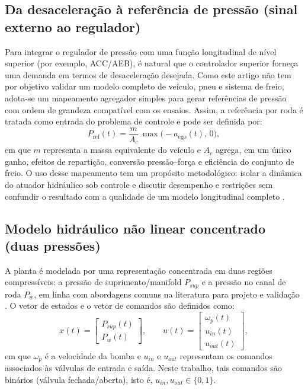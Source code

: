 \documentclass[a4paper]{ifacconf}
\begin{document}
\subsection{Da desaceleração à referência de pressão (sinal externo ao regulador)}
Para integrar o regulador de pressão com uma função longitudinal de nível superior (por exemplo, ACC/AEB), é natural que o controlador superior forneça uma demanda em termos de desaceleração desejada. Como este artigo não tem por objetivo validar um modelo completo de veículo, pneu e sistema de freio, adota-se um mapeamento agregador simples para gerar referências de pressão com ordem de grandeza compatível com os ensaios. Assim, a referência por roda é tratada como entrada do problema de controle e pode ser definida por:
\begin{equation}
   P_{\mathrm{ref}}(t) = \frac{m}{A_c}\,\max\big(-a_{\mathrm{ego}}(t),\,0\big),
   \label{eq:aref_to_pref}
\end{equation}
em que $m$ representa a massa equivalente do veículo e $A_c$ agrega, em um único ganho, efeitos de repartição, conversão pressão--força e eficiência do conjunto de freio. O uso desse mapeamento tem um propósito metodológico: isolar a dinâmica do atuador hidráulico sob controle e discutir desempenho e restrições sem confundir o resultado com a qualidade de um modelo longitudinal completo \cite{Lentin2022}.

\subsection{Modelo hidráulico não linear concentrado (duas pressões)}
A planta é modelada por uma representação concentrada em duas regiões compressíveis: a pressão de suprimento/manifold $P_{sup}$ e a pressão no canal de roda $P_w$, em linha com abordagens comuns na literatura para projeto e validação \cite{HouhuaJing2022,Lv2014,ZengYangHuang2023}. O vetor de estados e o vetor de comandos são definidos como:
\begin{equation}
   x(t)=\begin{bmatrix} P_{sup}(t) \\ P_w(t) \end{bmatrix},
   \qquad
   u(t)=\begin{bmatrix} \omega_p(t) \\ u_{in}(t) \\ u_{out}(t) \end{bmatrix},
   \label{eq:states_inputs}
\end{equation}
em que $\omega_p$ é a velocidade da bomba e $u_{in}$ e $u_{out}$ representam os comandos associados às válvulas de entrada e saída. Neste trabalho, tais comandos são binários (válvula fechada/aberta), isto é, $u_{in},u_{out}\in\{0,1\}$.
\end{document}
